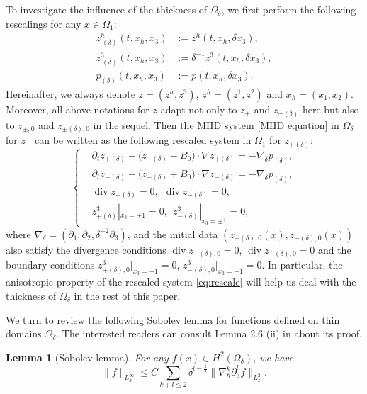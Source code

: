 \documentclass[10pt,reqno]{amsart}
\numberwithin{equation}{section}
\newtheorem{lemma}[theorem]{Lemma}
\begin{document}
To investigate the  
influence of the thickness of   $\Omega_\delta$, we first perform the following rescalings  
for any $x\in \Omega_1$:  
\begin{align*}
	z_{\ (\delta)}^h(t,x_h, x_3) &:=z^h(t,x_h,\delta x_3),\\
	z_{\ (\delta)}^3(t,x_h, x_3) &:=\delta^{-1}z^3(t,x_h,\delta x_3),\\
	p_{(\delta)}(t,x_h, x_3) &:=p(t,x_h,\delta x_3).
\end{align*}
Hereinafter, we always denote $z=(z^h,z^3)$,  $z^h=(z^1,z^2)$ and $x_h=(x_1,x_2)$. 
Moreover, all above notations for $z$ adapt not only to $z_\pm$ and  $z_{\pm(\delta)}$ here  but also to $z_{\pm,0}$ and $z_{\pm(\delta),0}$ in the sequel. 
Then the MHD system \eqref{MHD equation} in $\Omega_\delta$ for $z_{\pm}$ can be written as the following rescaled system in $\Omega_1$ for $z_{\pm(\delta)}$: 
\begin{equation}\label{eq:rescale}
	\begin{cases}
		&	\partial_tz_{+(\delta)}+\big(z_{-(\delta)}-B_0\big)\cdot\nabla z_{+(\delta)}=-\nabla_\delta p_{(\delta)},\\
		&	\partial_tz_{-(\delta)}+\big(z_{+(\delta)}+B_0\big)\cdot\nabla z_{-(\delta)}=-\nabla_\delta p_{(\delta)},\\
		&	\operatorname{div} z_{+(\delta)}=0,\ \ 
		\operatorname{div} z_{-(\delta)}=0,\\
		&z_{+(\delta)}^3|_{x_3=\pm 1}=0,\ \ z_{-(\delta)}^3|_{x_3=\pm 1}=0,
	\end{cases}
\end{equation}
where  $\nabla_\delta=(\partial_1,\partial_2,\delta^{-2}\partial_3)$, and  
the initial data $(z_{+(\delta),0}(x),z_{-(\delta),0}(x))$ also satisfy the divergence  conditions  $\operatorname{div} z_{+(\delta),0}=0$,  
$\operatorname{div} z_{-(\delta),0}=0$ and the boundary conditions 
$z_{+(\delta),0}^3|_{x_3=\pm 1}=0$,  $z_{-(\delta),0}^3|_{x_3=\pm 1}=0$. 
In particular, the anisotropic property of the rescaled system \eqref{eq:rescale} will help us deal with the thickness of $\Omega_{\delta}$ in the rest of this paper. 



We turn to review the following Sobolev lemma for functions defined on thin domains $\Omega_\delta$. The interested readers can consult Lemma 2.6 (ii) in \cite{Xu} about its proof.
\begin{lemma}[Sobolev lemma]\label{lemma:sobolev}
	For any $f(x)\in H^2(\Omega_{\delta})$, we have 
	\[\|f\|_{L^\infty_x}\leqslant C\sum_{k+l\leqslant 2}\delta^{l-\frac{1}{2}}\|\nabla^k_h\partial_3^lf\|_{L^2_x}.\]
\end{lemma}
 
\end{document}
